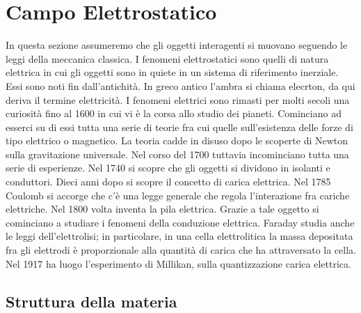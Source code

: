 \chapter{Campo Elettrostatico}

In questa sezione assumeremo che gli oggetti interagenti si muovano seguendo le leggi della meccanica classica. I fenomeni elettrostatici sono quelli di natura elettrica in cui gli oggetti sono in quiete in un sistema di riferimento inerziale. Essi sono noti fin dall'antichità. In greco antico l'ambra si chiama elecrton, da qui deriva il termine elettricità. I fenomeni elettrici sono rimasti per molti secoli una curiosità fino al 1600 in cui vi è la corsa allo studio dei pianeti. Cominciano ad esserci su di essi tutta una serie di teorie fra cui quelle sull'esistenza delle forze di tipo elettrico o magnetico. La teoria cadde in disuso dopo le scoperte di Newton sulla gravitazione universale. Nel corso del 1700 tuttavia incominciano tutta una serie di esperienze. Nel 1740 si scopre che gli oggetti si dividono in isolanti e conduttori. Dieci anni dopo si scopre il concetto di carica elettrica. Nel 1785 Coulomb si accorge che c'è una legge generale che regola l'interazione fra cariche elettriche. Nel 1800 volta inventa la pila elettrica. Grazie a tale oggetto si cominciano a studiare i fenomeni della conduzione elettrica. Faraday studia anche le leggi dell'elettrolisi; in particolare, in una cella elettrolitica la massa depositata fra gli elettrodi è proporzionale alla quantità di carica che ha attraversato la cella. Nel 1917 ha luogo l'esperimento di Millikan, sulla quantizzazione carica elettrica.

\section{Struttura della materia}

